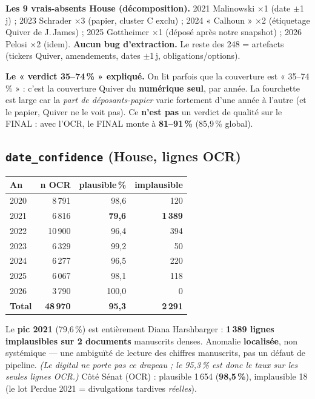\documentclass[11pt,a4paper]{article}
\newcommand{\code}[1]{\texttt{\small #1}}
\begin{document}
\textbf{Les 9 vrais-absents House (décomposition).} 2021 Malinowski $\times$1 (date $\pm$1\,j) ; 2023
Schrader $\times$3 (papier, cluster C exclu) ; 2024 « Calhoun » $\times$2 (étiquetage Quiver de
J.\,James) ; 2025 Gottheimer $\times$1 (déposé après notre snapshot) ; 2026 Pelosi $\times$2 (idem).
\textbf{Aucun bug d'extraction.} Le reste des 248 = artefacts (tickers Quiver, amendements, dates
$\pm$1\,j, obligations/options).

\textbf{Le « verdict 35--74\,\% » expliqué.} On lit parfois que la couverture est « 35--74\,\% » : c'est
la couverture Quiver du \textbf{numérique seul}, par année. La fourchette est large car la \emph{part de
déposants-papier} varie fortement d'une année à l'autre (et le papier, Quiver ne le voit pas). Ce
\textbf{n'est pas} un verdict de qualité sur le FINAL : avec l'OCR, le FINAL monte à \textbf{81--91\,\%}
(85,9\,\% global).

\subsection{\code{date\_confidence} (House, lignes OCR)}

\begin{center}\small
\begin{tabular}{@{}lrrr@{}}
\toprule
\textbf{An} & \textbf{n OCR} & \textbf{plausible\,\%} & \textbf{implausible} \\
\midrule
2020 & 8\,791 & 98,6 & 120 \\
2021 & 6\,816 & \textbf{79,6} & \textbf{1\,389} \\
2022 & 10\,900 & 96,4 & 394 \\
2023 & 6\,329 & 99,2 & 50 \\
2024 & 6\,277 & 96,5 & 220 \\
2025 & 6\,067 & 98,1 & 118 \\
2026 & 3\,790 & 100,0 & 0 \\
\midrule
\textbf{Total} & \textbf{48\,970} & \textbf{95,3} & \textbf{2\,291} \\
\bottomrule
\end{tabular}
\end{center}

Le \textbf{pic 2021} (79,6\,\%) est entièrement Diana Harshbarger : \textbf{1\,389 lignes implausibles
sur 2 documents} manuscrits denses. Anomalie \textbf{localisée}, non systémique --- une ambiguïté de
lecture des chiffres manuscrits, pas un défaut de pipeline. \emph{(Le digital ne porte pas ce drapeau ;
le 95,3\,\% est donc le taux sur les seules lignes OCR.)} Côté Sénat (OCR) : plausible 1\,654
(\textbf{98,5\,\%}), implausible 18 (le lot Perdue 2021 = divulgations tardives \emph{réelles}).
\end{document}
